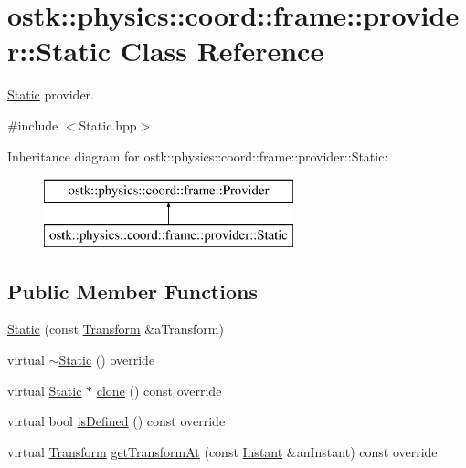 \hypertarget{classostk_1_1physics_1_1coord_1_1frame_1_1provider_1_1_static}{}\section{ostk\+:\+:physics\+:\+:coord\+:\+:frame\+:\+:provider\+:\+:Static Class Reference}
\label{classostk_1_1physics_1_1coord_1_1frame_1_1provider_1_1_static}


\hyperlink{classostk_1_1physics_1_1coord_1_1frame_1_1provider_1_1_static}{Static} provider.  




{\ttfamily \#include $<$Static.\+hpp$>$}

Inheritance diagram for ostk\+:\+:physics\+:\+:coord\+:\+:frame\+:\+:provider\+:\+:Static\+:\begin{figure}[H]
\begin{center}
\leavevmode
\includegraphics[height=2.000000cm]{classostk_1_1physics_1_1coord_1_1frame_1_1provider_1_1_static}
\end{center}
\end{figure}
\subsection*{Public Member Functions}
\begin{DoxyCompactItemize}
\item 
\hyperlink{classostk_1_1physics_1_1coord_1_1frame_1_1provider_1_1_static_a0526a2aa502a52e89f7d205c5b64e90c}{Static} (const \hyperlink{classostk_1_1physics_1_1coord_1_1_transform}{Transform} \&a\+Transform)
\item 
virtual \hyperlink{classostk_1_1physics_1_1coord_1_1frame_1_1provider_1_1_static_aa6ab7218047ee54f78825c75e821f2db}{$\sim$\+Static} () override
\item 
virtual \hyperlink{classostk_1_1physics_1_1coord_1_1frame_1_1provider_1_1_static}{Static} $\ast$ \hyperlink{classostk_1_1physics_1_1coord_1_1frame_1_1provider_1_1_static_a3e25a6fc979fc4ac28d8cbea4835ea71}{clone} () const override
\item 
virtual bool \hyperlink{classostk_1_1physics_1_1coord_1_1frame_1_1provider_1_1_static_a5b7189d8cff8128fee348af2feac1304}{is\+Defined} () const override
\item 
virtual \hyperlink{classostk_1_1physics_1_1coord_1_1_transform}{Transform} \hyperlink{classostk_1_1physics_1_1coord_1_1frame_1_1provider_1_1_static_a0fbed95f9f17a51aca6d8f83c9532510}{get\+Transform\+At} (const \hyperlink{classostk_1_1physics_1_1time_1_1_instant}{Instant} \&an\+Instant) const override
\end{DoxyCompactItemize}


